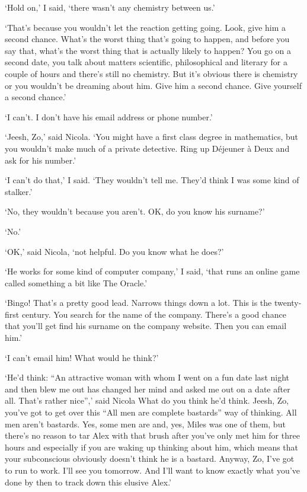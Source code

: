 `Hold on,' I said, `there wasn't any chemistry between us.'

`That's because you wouldn't let the reaction getting going. Look,
give him a second chance. What's the worst thing that's going to
happen, and before you say {\twelveit that\/}, what's the worst thing that is
actually likely to happen? You go on a second date, you talk about
matters scientific, philosophical and literary for a couple of hours
and there's still no chemistry. But it's obvious there {\twelveit is\/} chemistry or you
wouldn't be dreaming about him. Give him a second chance. Give
{\twelveit yourself\/} a second chance.'

`I can't. I don't have his email address or phone number.'

`Jeesh, Zo,' said Nicola. `You might have a first class degree in mathematics, but
you wouldn't make much of a private detective. Ring up D{\'e}jeuner
{\`a} Deux and ask for his number.'

`I can't do that,' I said. `They wouldn't tell me. They'd think I was some
kind of stalker.'

`No, they wouldn't because you aren't. OK, do you know his surname?'

`No.'

`OK,' said Nicola, `not helpful. Do you know what he does?'

`He works for some kind of computer company,' I said, `that runs an online game
called something a bit like {\twelvesl The Oracle}.'

`Bingo! That's a pretty good lead. Narrows things down a lot. This
is the twenty-first century. You search for the name of the company.
There's a good chance that you'll get find his surname on the
company website. Then you can email him.'

`I can't email him! What would he think?'

`He'd think: ``An attractive woman with whom I went on a fun date
last night and then blew me out has changed her mind and asked me out on a date after all. That's rather nice'',' said Nicola
What do you think he'd think. Jeesh, Zo, you've got to get over this
``All men are complete bastards'' way of thinking. All men aren't
bastards. Yes, some men are and, yes, Miles was one of them, but
there's no reason to tar Alex with that brush after you've only met
him for three hours and especially if you are waking up thinking
about him, which means that your subconscious obviously doesn't think he
is a bastard. Anyway, Zo, I've got to run to work. I'll see you
tomorrow. And I'll want to know exactly what you've done by then to
track down this elusive Alex.'

